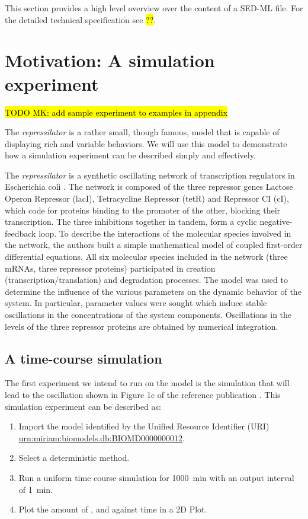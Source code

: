 This section provides a high level overview over the content of a SED-ML file. For the detailed technical specification see \hl{??}. 

\section{Motivation: A simulation experiment}
\label{motivation:example}

\hl{TODO MK: add sample experiment to examples in appendix}

The \emph{repressilator} is a rather small, though famous, model that is capable of displaying rich and variable behaviors. We will use this model to demonstrate how a simulation experiment can be described simply and effectively. 

The \emph{repressilator} is a synthetic oscillating network of transcription regulators in Escherichia coli \citep{Elowitz:2000}. The network is composed of the three repressor genes Lactose Operon Repressor (lacI), Tetracycline Repressor (tetR) and Repressor CI (cI), which code for proteins binding to the promoter of the other, blocking their transcription. The three inhibitions together in tandem, form a cyclic negative-feedback loop. To describe the interactions of the molecular species involved in the network, the authors built a simple mathematical model of coupled first-order differential equations. All six molecular species included in the network (three mRNAs, three repressor proteins) participated in creation (transcription/translation) and degradation processes. The model was used to determine the influence of the various parameters on the dynamic behavior of the system. In particular, parameter values were sought which induce stable oscillations in the concentrations of the system components. Oscillations in the levels of the three repressor proteins are obtained by numerical integration. 

\subsection{A time-course simulation}
\label{sec:intro1}
The first experiment we intend to run on the model is the simulation that will lead to the oscillation shown in Figure 1c of the reference publication \citep{Elowitz:2000}. This simulation experiment can be described as:

\begin{enumerate}
 	\item{Import the model identified by the Unified Resource Identifier (URI) \citep{Berners-Lee:2005} \url{urn:miriam:biomodels.db:BIOMD0000000012}.}
 	\item {Select a deterministic method.}
 	\item{Run a uniform time course simulation for 1000~min with an output interval of 1~min.}
 	\item{Plot the amount of ,  and  against time in a 2D Plot.}
 \end{enumerate}

